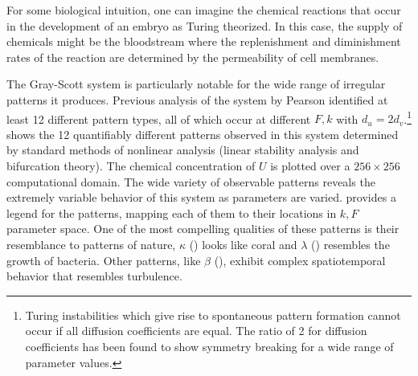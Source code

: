 For some biological intuition, one can imagine the chemical reactions that occur in the development of an embryo as Turing theorized. In this case, the supply of chemicals might be the bloodstream where the replenishment and diminishment rates of the reaction are determined by the permeability of cell membranes.

The Gray-Scott system is particularly notable for the wide range of irregular patterns it produces. Previous analysis of the system by Pearson identified at least 12 different pattern types, all of which occur at different $F, k$ with $d_u = 2 d_v$.\footnote{Turing instabilities which give rise to spontaneous pattern formation cannot occur if all diffusion coefficients are equal. The ratio of 2 for diffusion coefficients has been found to show symmetry breaking for a wide range of parameter values.}  shows the 12 quantifiably different patterns observed in this system determined by standard methods of nonlinear analysis (\eg linear stability analysis and bifurcation theory). The chemical concentration of $U$ is plotted over a $256 \times 256$ computational domain. The wide variety of observable patterns reveals the extremely variable behavior of this system as parameters are varied.  provides a legend for the patterns, mapping each of them to their locations in $k, F$ parameter space. One of the most compelling qualities of these patterns is their resemblance to patterns of nature, \eg $\kappa$ () looks like coral and $\lambda$ () resembles the growth of bacteria. Other patterns, like $\beta$ (), exhibit complex spatiotemporal behavior that resembles turbulence.

